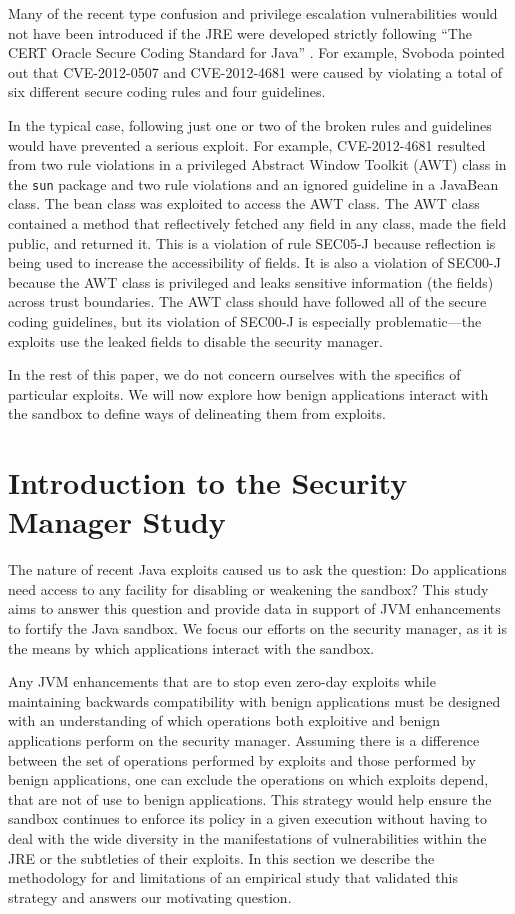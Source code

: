 \documentclass{sig-alternate}
\begin{document}
Many of the recent type confusion and privilege escalation vulnerabilities
would not have been introduced if the JRE were developed strictly
following ``The CERT Oracle Secure Coding Standard for Java'' \cite{long_cert_2011}.
For example, Svoboda \cite{svoboda_anatomy_blog_2013,svoboda_anatomy_2014}
pointed out that CVE-2012-0507 and CVE-2012-4681 were caused by violating
a total of six different secure coding rules and four guidelines. 

In the typical case, following just one or two of the broken rules
and guidelines would have prevented a serious exploit. For example,
CVE-2012-4681 resulted from two rule violations in a privileged Abstract
Window Toolkit (AWT) class in the \texttt{sun} package and two rule
violations and an ignored guideline in a JavaBean class. The bean
class was exploited to access the AWT class. The AWT class contained
a method that reflectively fetched any field in any class, made the
field public, and returned it. This is a violation of rule SEC05-J
because reflection is being used to increase the accessibility of
fields. It is also a violation of SEC00-J because the AWT class is
privileged and leaks sensitive information (the fields) across trust
boundaries. The AWT class should have followed all of the secure coding
guidelines, but its violation of SEC00-J is especially problematic---the
exploits use the leaked fields to disable the security manager. 

In the rest of this paper, we do not concern ourselves with the specifics
of particular exploits. We will now explore how benign applications interact with the sandbox to define ways of delineating them from exploits. 


\section{Introduction to the Security Manager Study}\label{sec:Security-Manager-Study}

The nature of recent Java exploits caused us to ask the question: Do applications need access to any facility for disabling or weakening the sandbox? This study aims to answer this question and provide data in support of JVM enhancements to fortify the Java sandbox.
We focus our efforts on the security manager, as it is the means by
which applications interact with the sandbox. 

Any JVM enhancements that are to stop even zero-day exploits while maintaining backwards compatibility with benign applications must be designed with an understanding of which operations both exploitive
and benign applications perform on the security manager. Assuming
there is a difference between the set of operations performed by exploits
and those performed by benign applications, one can exclude the operations
on which exploits depend, that are not of use to benign applications. This strategy would help ensure the sandbox
continues to enforce its policy in a given execution without having
to deal with the wide diversity in the manifestations of vulnerabilities
within the JRE or the subtleties of their exploits. In this section
we describe the methodology for and limitations of an empirical study
that validated this strategy and answers our motivating question.
\end{document}
